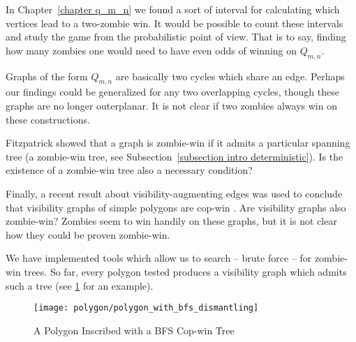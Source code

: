 In Chapter~\ref{chapter q_m_n} we found a sort of interval for calculating which vertices lead to a two-zombie win. It would be possible to count these intervals and study the game from the probabilistic point of view. That is to say, finding how many zombies one would need to have even odds of winning on $Q_{m,n}$.

Graphs of the form $Q_{m,n}$ are basically two cycles which share an edge. Perhaps our findings could be generalized for any two overlapping cycles, though these graphs are no longer outerplanar. It is not clear if two zombies always win on these constructions.

Fitzpatrick showed that a graph is zombie-win if it admits a particular spanning tree (a zombie-win tree, see Subsection~\ref{subsection intro deterministic}). Is the existence of a zombie-win tree also a necessary condition?

Finally, a recent result about visibility-augmenting edges \cite{aichholzer2011convexifying} was used to conclude that visibility graphs of simple polygons are cop-win \cite{lubiw2017visibility}. Are visibility graphs also zombie-win? Zombies seem to win handily on these graphs, but it is not clear how they could be proven zombie-win.

We have implemented tools which allow us to search -- brute force -- for zombie-win trees. So far, every polygon tested produces a visibility graph which admits such a tree (see \ref{fig:polygon_with_bfs_dismantling} for an example).

\begin{figure}
  \centering
  \texttt{[image: polygon/polygon\_with\_bfs\_dismantling]}
  \caption{A Polygon Inscribed with a BFS Cop-win Tree \label{fig:polygon_with_bfs_dismantling}}
\end{figure}
